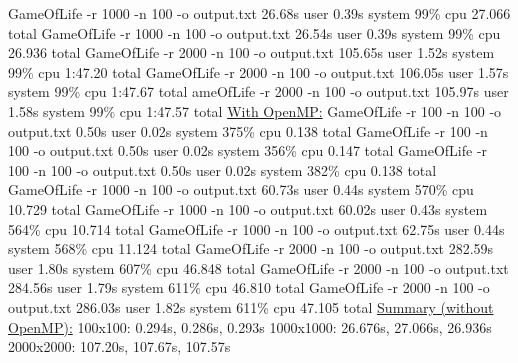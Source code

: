 \documentclass[a4paper,12pt,twoside]{report}
\begin{document}
GameOfLife -r 1000 -n 100 -o output.txt  26.68s user 0.39s system 99\% cpu 27.066 total \newline
GameOfLife -r 1000 -n 100 -o output.txt  26.54s user 0.39s system 99\% cpu 26.936 total \newline
\newline
GameOfLife -r 2000 -n 100 -o output.txt  105.65s user 1.52s system 99\% cpu 1:47.20 total \newline
GameOfLife -r 2000 -n 100 -o output.txt  106.05s user 1.57s system 99\% cpu 1:47.67 total \newline
ameOfLife -r 2000 -n 100 -o output.txt  105.97s user 1.58s system 99\% cpu 1:47.57 total \newline
\newline
\underline{With OpenMP:} \newline
\newline
GameOfLife -r 100 -n 100 -o output.txt  0.50s user 0.02s system 375\% cpu 0.138 total \newline
GameOfLife -r 100 -n 100 -o output.txt  0.50s user 0.02s system 356\% cpu 0.147 total \newline
GameOfLife -r 100 -n 100 -o output.txt  0.50s user 0.02s system 382\% cpu 0.138 total\newline
\newline
GameOfLife -r 1000 -n 100 -o output.txt  60.73s user 0.44s system 570\% cpu 10.729 total \newline
GameOfLife -r 1000 -n 100 -o output.txt  60.02s user 0.43s system 564\% cpu 10.714 total \newline
GameOfLife -r 1000 -n 100 -o output.txt  62.75s user 0.44s system 568\% cpu 11.124 total \newline
\newline
GameOfLife -r 2000 -n 100 -o output.txt  282.59s user 1.80s system 607\% cpu 46.848 total \newline
GameOfLife -r 2000 -n 100 -o output.txt  284.56s user 1.79s system 611\% cpu 46.810 total \newline
GameOfLife -r 2000 -n 100 -o output.txt  286.03s user 1.82s system 611\% cpu 47.105 total \newline
\newline
\underline{Summary (without OpenMP):} \newline \newline
100x100:	0.294s,	 0.286s,  0.293s \newline
1000x1000: 26.676s, 27.066s, 26.936s \newline
2000x2000: 107.20s, 107.67s, 107.57s \newline
\end{document}
